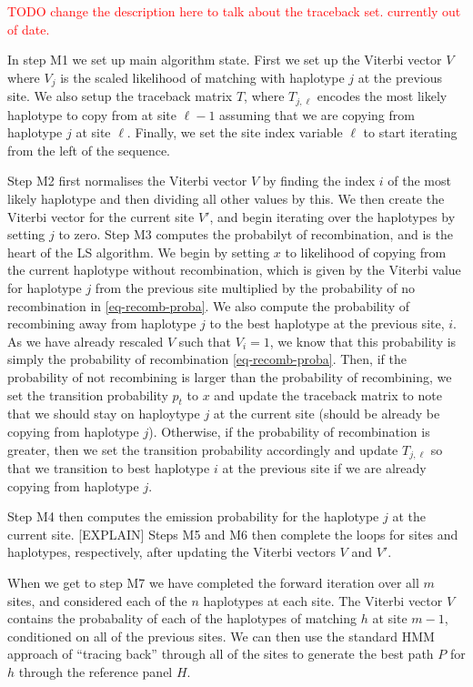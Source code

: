 \documentclass{article}
\begin{document}
\textcolor{red}{TODO change the description here to talk about the
traceback set. currently out of date.}

In step M1 we set up main algorithm state. First we set up
the Viterbi vector $V$ where $V_j$ is the scaled likelihood of matching
with haplotype $j$ at the previous site. We also setup the traceback matrix
$T$, where $T_{j, \ell}$ encodes the most likely haplotype to copy from at site
$\ell - 1$ assuming that we are copying from haplotype $j$ at site $\ell$.
Finally, we set the site index variable $\ell$ to start iterating from the
left of the sequence.

Step M2 first normalises the Viterbi vector $V$ by finding the index $i$
of the most likely haplotype and then dividing all other values by this. We
then create the Viterbi vector for the current site $V'$, and begin
iterating over the haplotypes by setting $j$ to zero. Step M3 computes
the probabilyt of recombination, and is the heart of the LS algorithm.
We begin by setting $x$ to likelihood of copying from the current
haplotype without recombination, which is given by the Viterbi value
for haplotype $j$ from the previous site multiplied by the
probability of no recombination in \eqref{eq-recomb-proba}. We also
compute the probability of recombining away from haplotype $j$
to the best haplotype at the previous site, $i$. As we have already
rescaled $V$ such that $V_i = 1$, we know that this probability is
simply the probability of recombination \eqref{eq-recomb-proba}. Then,
if the probability of not recombining is larger than the probability
of recombining, we set the transition probability $p_t$ to $x$
and update the traceback matrix to note that we should stay on haploytype
$j$ at the current site (should be already be copying from haplotype $j$).
Otherwise, if the probability of recombination is greater, then we set the
transition probability accordingly and update $T_{j, \ell}$ so that we
transition to best haplotype $i$ at the previous site if we are already
copying from haplotype $j$.

Step M4 then computes the emission probability for the haplotype $j$
at the current site. [EXPLAIN] Steps M5 and M6 then complete the loops
for sites and haplotypes, respectively, after updating the Viterbi
vectors $V$ and $V'$.

When we get to step M7 we have completed the forward iteration over
all $m$ sites, and considered each of the $n$ haplotypes at each site.
The Viterbi vector $V$ contains the probabality of each of the haplotypes
of matching $h$ at site $m - 1$, conditioned on all of the previous sites.
We can then use the standard HMM approach of ``tracing back'' through
all of the sites to generate the best path $P$ for $h$ through the
reference panel $H$.
\end{document}
